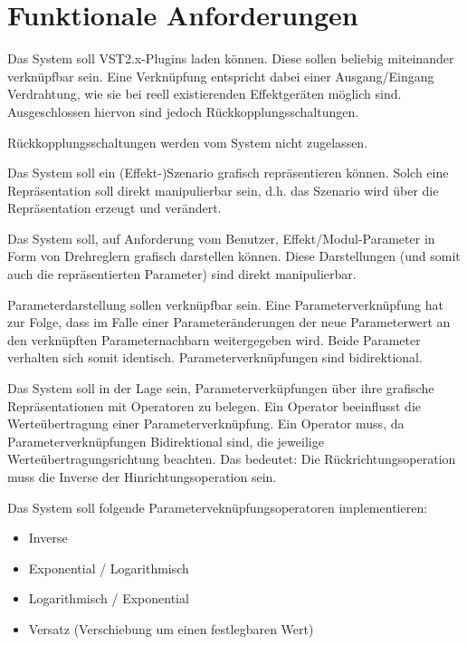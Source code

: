 \section{Funktionale Anforderungen}


 Das System soll VST2.x-Plugins laden können. Diese sollen beliebig miteinander verknüpfbar sein. Eine Verknüpfung entspricht dabei einer Ausgang/Eingang Verdrahtung, wie sie bei reell existierenden Effektgeräten möglich sind. Ausgeschlossen hiervon sind jedoch Rückkopplungsschaltungen.

 Rückkopplungsschaltungen werden vom System nicht zugelassen.

 Das System soll ein (Effekt-)Szenario grafisch repräsentieren können. Solch eine Repräsentation soll direkt manipulierbar sein, d.h. das Szenario wird über die Repräsentation erzeugt und verändert.

 Das System soll, auf Anforderung vom Benutzer, Effekt/Modul-Parameter in Form von Drehreglern grafisch darstellen können. Diese Darstellungen (und somit auch die repräsentierten Parameter) sind direkt manipulierbar.

  Parameterdarstellung sollen verknüpfbar sein. Eine Parameterverknüpfung hat zur Folge, dass im Falle einer Parameteränderungen der neue Parameterwert an den verknüpften Parameternachbarn weitergegeben wird.
Beide Parameter verhalten sich somit identisch. Parameterverknüpfungen sind bidirektional.

 Das System soll in der Lage sein, Parameterverküpfungen über ihre grafische Repräsentationen mit Operatoren zu belegen. Ein Operator beeinflusst die Werteübertragung einer Parameterverknüpfung. Ein Operator muss, da Parameterverknüpfungen Bidirektional sind, die jeweilige Werteübertragungsrichtung beachten. Das bedeutet: Die Rückrichtungsoperation muss die Inverse der Hinrichtungsoperation sein.

 Das System soll folgende Parameterveknüpfungsoperatoren implementieren:
			  \begin{itemize}
			  	\item Inverse
				\item Exponential / Logarithmisch
				\item Logarithmisch / Exponential
				\item Versatz (Verschiebung um einen festlegbaren Wert)
			  \end{itemize}

